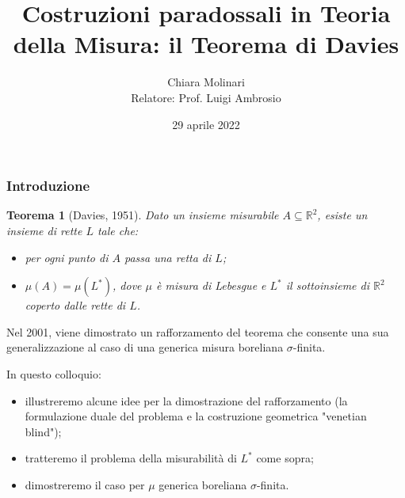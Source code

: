 \documentclass[11pt]{beamer} %
\author[Chiara Molinari]{Chiara Molinari\\[10mm] Relatore: Prof. Luigi Ambrosio}
\title[Il Teorema di Davies]{Costruzioni paradossali in Teoria della Misura: il Teorema di Davies}
\date{29 aprile 2022}
\newcommand{\R}{\mathbb{R}}
\newcommand{\<}{\langle}
\renewcommand{\>}{\rangle}
\theoremstyle{theorem}
\newtheorem{teo}{Teorema}
\theoremstyle{theorem}
\theoremstyle{theorem}
\theoremstyle{theorem}
\theoremstyle{theorem}
\begin{document}

\begin{frame}
	\maketitle
\end{frame}


\begin{frame}[fragile]
	\frametitle{Introduzione}
	\begin{teo}[Davies, 1951] Dato un insieme misurabile $A \subseteq \R^2$, esiste un insieme di rette $L$ tale che:\\
	\begin{itemize}	
	\item per ogni punto di $A$ passa una retta di $L$;\\
	\item $\mu(A)=\mu(L^*)$, dove $\mu$ è misura di Lebesgue e $L^*$ il sottoinsieme di $\R^2$ coperto dalle rette di $L$.
	\end{itemize}
	\end{teo}
	\pause
	
	Nel 2001, viene dimostrato un rafforzamento del teorema che consente una sua generalizzazione al caso di una generica misura boreliana $\sigma$-finita. 
	\pause
	\medskip
	 
	In questo colloquio:\\
	\begin{itemize}
		\item illustreremo alcune idee per la dimostrazione del rafforzamento (la formulazione duale del problema e la costruzione geometrica "venetian blind");\\ \pause
		\item tratteremo il problema della misurabilità di $L^*$ come sopra;\\ \pause
		\item dimostreremo il caso per $\mu$ generica boreliana $\sigma$-finita.
	\end{itemize}

\end{frame}
	
	
	
	
\end{document}
